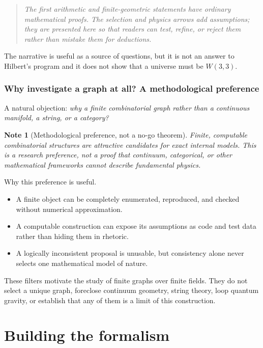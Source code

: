 \documentclass[11pt]{article}
\def\textbf#1{#1}%
\newtheorem*{note}{Note}
\begin{document}
\begin{quote}
\itshape
The first arithmetic and finite-geometric statements have ordinary mathematical proofs.  The selection and physics arrows add assumptions; they are presented here so that readers can test, refine, or reject them rather than mistake them for deductions.
\end{quote}

The narrative is useful as a source of questions, but it is not an answer to Hilbert's program and it does not show that a universe must be $W(3,3)$.

\section{Why investigate a graph at all?  A methodological preference}

A natural objection: \emph{why a finite combinatorial graph rather than a continuous manifold, a string, or a category?}

\begin{note}[Methodological preference, not a no-go theorem]
Finite, computable combinatorial structures are attractive candidates for exact internal models.  This is a research preference, not a proof that continuum, categorical, or other mathematical frameworks cannot describe fundamental physics.
\end{note}

\textbf{Why this preference is useful.}
\begin{itemize}[leftmargin=2em]
\item A finite object can be completely enumerated, reproduced, and checked without numerical approximation.
\item A computable construction can expose its assumptions as code and test data rather than hiding them in rhetoric.
\item A logically inconsistent proposal is unusable, but consistency alone never selects one mathematical model of nature.
\end{itemize}

These filters motivate the study of finite graphs over finite fields.  They do not select a unique graph, foreclose continuum geometry, string theory, loop quantum gravity, or establish that any of them is a limit of this construction.

\part{Building the formalism}
\end{document}
